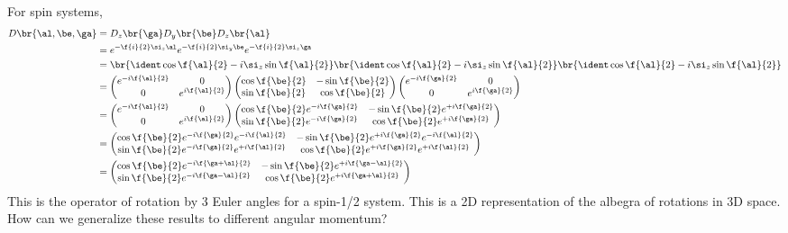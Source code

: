\documentclass{article}
\begin{document}
For spin systems,
\begin{align*}
    D\br{\al, \be, \ga}
    &= D_z\br{\ga}D_y\br{\be}D_z\br{\al} \\
    &= e^{-\f{i}{2} \si_z \al}e^{-\f{i}{2} \si_y \be}e^{-\f{i}{2} \si_z \ga}  \\
    &= \br{\ident \cos \f{\al}{2} - i \si_z \sin \f{\al}{2}}\br{\ident \cos \f{\al}{2} - i \si_z \sin \f{\al}{2}}\br{\ident \cos \f{\al}{2} - i \si_z \sin \f{\al}{2}}\\
    &=
    \begin{pmatrix}
        e^{-i\f{\al}{2}} & 0 \\
        0 & e^{i\f{\al}{2}} \\
    \end{pmatrix}
    \begin{pmatrix}
        \cos \f{\be}{2} & -\sin \f{\be}{2} \\
        \sin \f{\be}{2} & \cos \f{\be}{2} \\
    \end{pmatrix}
    \begin{pmatrix}
        e^{-i\f{\ga}{2}} & 0 \\
        0 & e^{i\f{\ga}{2}} \\
    \end{pmatrix}
    \\
    &=
    \begin{pmatrix}
        e^{-i\f{\al}{2}} & 0 \\
        0 & e^{i\f{\al}{2}} \\
    \end{pmatrix}
    \begin{pmatrix}
        \cos \f{\be}{2}e^{-i\f{\ga}{2}} & -\sin \f{\be}{2}e^{+i\f{\ga}{2}} \\
        \sin \f{\be}{2}e^{-i\f{\ga}{2}} & \cos \f{\be}{2}e^{+i\f{\ga}{2}} \\
    \end{pmatrix}
    \\
    &=
    \begin{pmatrix}
        \cos \f{\be}{2}e^{-i\f{\ga}{2}}e^{-i\f{\al}{2}} & -\sin \f{\be}{2}e^{+i\f{\ga}{2}}e^{-i\f{\al}{2}} \\
        \sin \f{\be}{2}e^{-i\f{\ga}{2}}e^{+i\f{\al}{2}} & \cos \f{\be}{2}e^{+i\f{\ga}{2}}e^{+i\f{\al}{2}} \\
    \end{pmatrix}
    \\
    &= \begin{pmatrix}
        \cos \f{\be}{2}e^{-i\f{\ga+\al}{2}} & -\sin \f{\be}{2}e^{+i\f{\ga-\al}{2}} \\
        \sin \f{\be}{2}e^{-i\f{\ga - \al}{2}} & \cos \f{\be}{2}e^{+i\f{\ga+\al}{2}} \\
    \end{pmatrix}
    \\
\end{align*}
This is the operator of rotation by $3$ Euler angles for a spin-1/2 system. This is a 2D representation of the albegra of rotations in 3D space. How can we generalize these results to different angular momentum?
\end{document}
